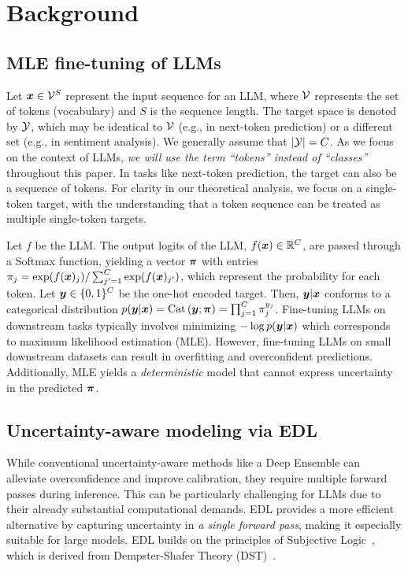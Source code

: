 \section{Background}
\subsection{MLE fine-tuning of LLMs}
Let $\bm{x} \in \mathcal{V}^S$ represent the input sequence for an LLM, where $\mathcal{V}$ represents the set of tokens (vocabulary) and $S$ is the sequence length.
The target space is denoted by $\mathcal{Y}$, which may be identical to $\mathcal{V}$ (e.g., in next-token prediction) or a different set (e.g., in sentiment analysis). We generally assume that $|\mathcal{Y}| = C$. 
As we focus on the context of LLMs, \emph{we will use the term ``tokens'' instead of ``classes''} throughout this paper. 
In tasks like next-token prediction, the target can also be a sequence of tokens. For clarity in our theoretical analysis, we focus on a single-token target, with the understanding that a token sequence can be treated as multiple single-token targets. 

Let $f$ be the LLM. The output logits of the LLM, $f(\bm{x}) \in \mathbb{R}^{C}$, are passed through a Softmax function, yielding a vector $\bm{\pi}$ with entries $\pi_j = \exp(f(\bm{x})_j) / \sum_{j^\prime = 1}^C \exp(f(\bm{x})_{j^\prime})$, which represent the probability for each token. Let $\bm{y} \in \{0, 1\}^C$ be the one-hot encoded target. Then, $\bm{y} | \bm{x}$ conforms to a categorical distribution $p(\bm{y}|\bm{x}) = \text{Cat}\left( \bm{y} ; \bm{\pi} \right) = \prod_{j=1}^C \pi_j^{y_j}$. Fine-tuning LLMs on downstream tasks typically involves minimizing $- \log p(\bm{y}|\bm{x})$ which corresponds to maximum likelihood estimation (MLE). However, fine-tuning LLMs on small downstream datasets can result in overfitting and overconfident predictions. 
Additionally, MLE yields a \emph{deterministic} model that cannot express uncertainty in the predicted $\bm{\pi}$.  

\subsection{Uncertainty-aware modeling via EDL}
While conventional uncertainty-aware methods like a Deep Ensemble can alleviate overconfidence and improve calibration, they require multiple forward passes during inference. This can be particularly challenging for LLMs due to their already substantial computational demands. EDL provides a more efficient alternative by capturing uncertainty in \emph{a single forward pass}, making it especially suitable for large models. EDL builds on the principles of Subjective Logic~\citep{josang1997artificial,josang2016subjective}, which is derived from Dempster-Shafer Theory (DST)~\citep{dempster1968generalization,shafer1976mathematical}. 

